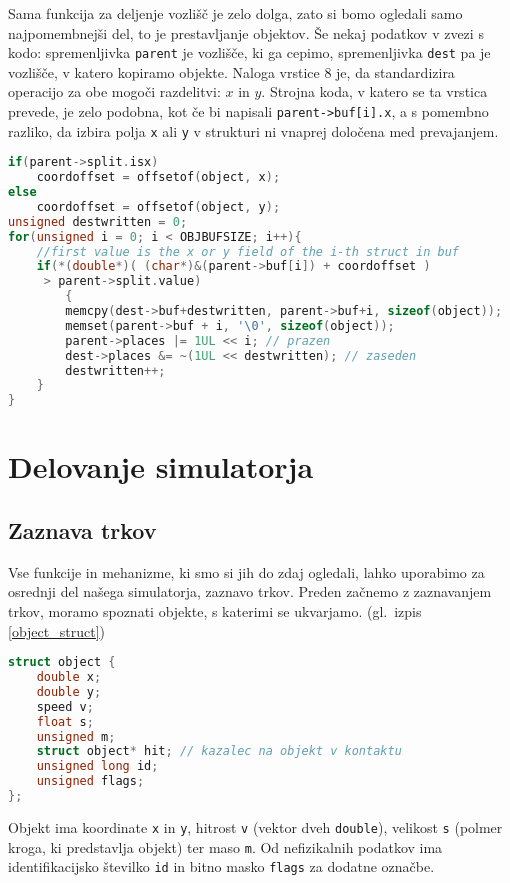 \documentclass[a4paper,12pt]{article}
\begin{document}
Sama funkcija za deljenje vozlišč je zelo dolga, zato si bomo ogledali samo najpomembnejši
del, to je prestavljanje objektov. Še nekaj podatkov v zvezi s kodo: spremenljivka \lstinline|parent|
je vozlišče, ki ga cepimo, spremenljivka \lstinline|dest| pa je vozlišče, v katero kopiramo objekte.
Naloga vrstice 8 je, da standardizira operacijo za obe mogoči razdelitvi: $x$ in $y$. Strojna koda, v
katero se ta vrstica prevede, je zelo podobna, kot če bi napisali \lstinline|parent->buf[i].x|, a s pomembno razliko, da izbira
polja \lstinline|x| ali \lstinline|y| v strukturi ni vnaprej določena med prevajanjem.

\begin{lstlisting}[caption={Razdeljevanje objektov med potomcema}, label=balance_buffers, language=C]
if(parent->split.isx) 
    coordoffset = offsetof(object, x);
else 
    coordoffset = offsetof(object, y);
unsigned destwritten = 0;
for(unsigned i = 0; i < OBJBUFSIZE; i++){
    //first value is the x or y field of the i-th struct in buf
    if(*(double*)( (char*)&(parent->buf[i]) + coordoffset )
     > parent->split.value)
        {
        memcpy(dest->buf+destwritten, parent->buf+i, sizeof(object));
        memset(parent->buf + i, '\0', sizeof(object));
        parent->places |= 1UL << i; // prazen
        dest->places &= ~(1UL << destwritten); // zaseden
        destwritten++;
    }
}
\end{lstlisting}
\section{Delovanje simulatorja}
\subsection{Zaznava trkov}
Vse funkcije in mehanizme, ki smo si jih do zdaj ogledali, lahko uporabimo za osrednji del
našega simulatorja, zaznavo trkov.
Preden začnemo z zaznavanjem trkov, moramo spoznati objekte, s katerimi se ukvarjamo. (gl.\  izpis \ref{object_struct})
\begin{lstlisting}[caption={Struktura objekta}, label=object_struct, language=C]
struct object {
    double x;
    double y;
    speed v;
    float s;
    unsigned m;
    struct object* hit; // kazalec na objekt v kontaktu
    unsigned long id;
    unsigned flags;
};
\end{lstlisting}
Objekt ima koordinate \lstinline|x| in \lstinline|y|, hitrost \lstinline|v| (vektor dveh \lstinline|double|),
velikost \lstinline|s| (polmer kroga, ki predstavlja objekt) ter maso \lstinline|m|. Od nefizikalnih podatkov ima
identifikacijsko številko \lstinline|id| in bitno masko \lstinline|flags| za dodatne označbe.
\end{document}
